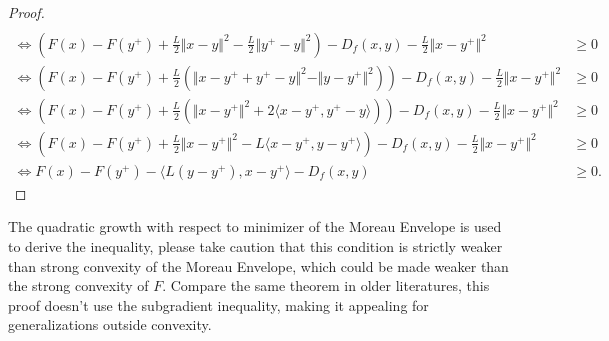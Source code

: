 \documentclass[12pt]{article}
\begin{document}
\begin{proof}
{\begin{align*}
            \\
            \iff 
            \left(
                F(x) - F(y^+) 
                + 
                \frac{L}{2}\Vert x - y\Vert^2 - 
                \frac{L}{2}\Vert y^+ - y\Vert^2
            \right)
            - 
            D_f(x, y) 
            - \frac{L}{2}\Vert x - y^+\Vert^2
            &\ge 0
            \\
            \iff 
            \left(
                F(x) - F(y^+) 
                + 
                \frac{L}{2}
                \left(
                    \Vert x - y^+ + y^+ - y\Vert^2
                    - 
                    \Vert y - y^+\Vert^2
                \right)
            \right)
            - 
            D_f(x, y) 
            - \frac{L}{2}\Vert x - y^+\Vert^2
            &\ge 0
            \\
            \iff 
            \left(
                F(x) - F(y^+) 
                + 
                \frac{L}{2}
                \left(
                    \Vert x - y^+\Vert^2 + 
                    2\langle x - y^+, y^+ - y\rangle
                \right)
            \right)
            - 
            D_f(x, y) 
            - \frac{L}{2}\Vert x - y^+\Vert^2
            &\ge 0
            \\
            \iff
            \left(
                F(x) - F(y^+) + \frac{L}{2}\Vert x - y^+\Vert^2 
                - L\langle  x - y^+, y - y^+\rangle
            \right)
            - 
            D_f(x, y) 
            - \frac{L}{2}\Vert x - y^+\Vert^2
            &\ge 0
            \\
            \iff 
            F(x) - F(y^+)
            - \langle L(y - y^+), x - y^+\rangle
            - D_f(x, y) 
            &\ge 0. 
        \end{align*}
        }
    \end{proof}
    \begin{remark}
        The quadratic growth with respect to minimizer of the Moreau Envelope is used to derive the inequality, please take caution that this condition is strictly weaker than strong convexity of the Moreau Envelope, which could be made weaker than the strong convexity of $F$. 
        Compare the same theorem in older literatures, this proof doesn't use the subgradient inequality, making it appealing for generalizations outside convexity. 
    \end{remark}
    
\end{document}
